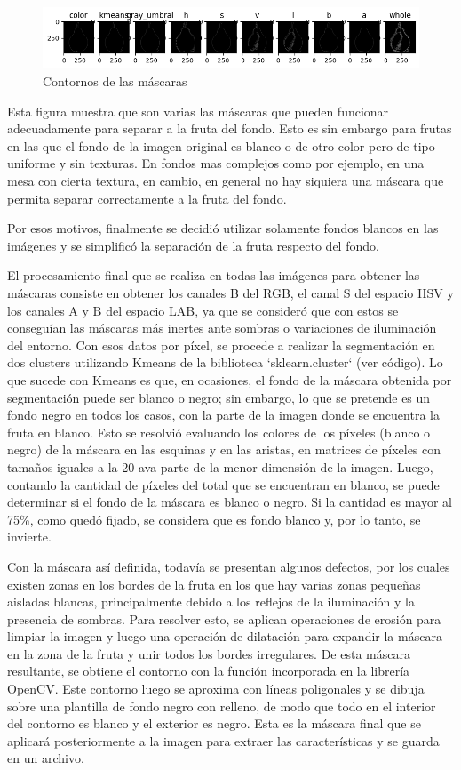 \documentclass[a4paper, 12pt]{article}
\begin{document}
\begin{figure}[!htbp]
    \centering
    \includegraphics[width=\linewidth]{CONTORNOS.png}
    \caption{Contornos de las máscaras}
    \label{CONTORNOS}
\end{figure}

Esta figura muestra que son varias las máscaras que pueden funcionar adecuadamente para separar a la fruta del fondo. Esto es sin embargo para frutas en las que el fondo de la imagen original es blanco o de otro color pero de tipo uniforme y sin texturas. En fondos mas complejos como por ejemplo, en una mesa con cierta textura, en cambio, en general no hay siquiera una máscara que permita separar correctamente a la fruta del fondo.

Por esos motivos, finalmente se decidió utilizar solamente fondos blancos en las imágenes y se simplificó la separación de la fruta respecto del fondo.

El procesamiento final que se realiza en todas las imágenes para obtener las máscaras consiste en obtener los canales B del RGB, el canal S del espacio HSV y los canales A y B del espacio LAB, ya que se consideró que con estos se conseguían las máscaras más inertes ante sombras o variaciones de iluminación del entorno. Con esos datos por píxel, se procede a realizar la segmentación en dos clusters utilizando Kmeans de la biblioteca `sklearn.cluster` (ver código). Lo que sucede con Kmeans es que, en ocasiones, el fondo de la máscara obtenida por segmentación puede ser blanco o negro; sin embargo, lo que se pretende es un fondo negro en todos los casos, con la parte de la imagen donde se encuentra la fruta en blanco. Esto se resolvió evaluando los colores de los píxeles (blanco o negro) de la máscara en las esquinas y en las aristas, en matrices de píxeles con tamaños iguales a la 20-ava parte de la menor dimensión de la imagen. Luego, contando la cantidad de píxeles del total que se encuentran en blanco, se puede determinar si el fondo de la máscara es blanco o negro. Si la cantidad es mayor al 75\%, como quedó fijado, se considera que es fondo blanco y, por lo tanto, se invierte.

Con la máscara así definida, todavía se presentan algunos defectos, por los cuales existen zonas en los bordes de la fruta en los que hay varias zonas pequeñas aisladas blancas, principalmente debido a los reflejos de la iluminación y la presencia de sombras. Para resolver esto, se aplican operaciones de erosión para limpiar la imagen y luego una operación de dilatación para expandir la máscara en la zona de la fruta y unir todos los bordes irregulares. De esta máscara resultante, se obtiene el contorno con la función incorporada en la librería OpenCV. Este contorno luego se aproxima con líneas poligonales y se dibuja sobre una plantilla de fondo negro con relleno, de modo que todo en el interior del contorno es blanco y el exterior es negro. Esta es la máscara final que se aplicará posteriormente a la imagen para extraer las características y se guarda en un archivo.
\end{document}
